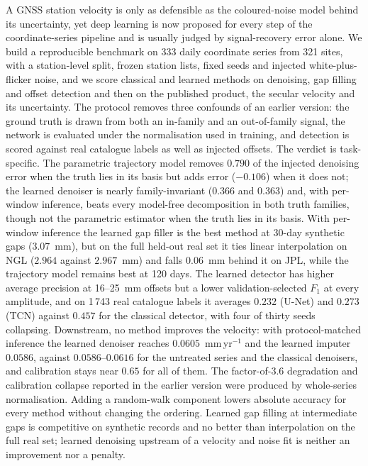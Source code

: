 A GNSS station velocity is only as defensible as the coloured-noise model behind
its uncertainty, yet deep learning is now proposed for every step of the
coordinate-series pipeline and is usually judged by signal-recovery error alone.
We build a reproducible benchmark on 333 daily coordinate series from 321 sites,
with a station-level split, frozen station lists, fixed seeds and injected
white-plus-flicker noise, and we score classical and learned methods on
denoising, gap filling and offset detection and then on the published product,
the secular velocity and its uncertainty. The protocol removes three confounds of
an earlier version: the ground truth is drawn from both an in-family and an
out-of-family signal, the network is evaluated under the normalisation used in
training, and detection is scored against real catalogue labels as well as
injected offsets. The verdict is task-specific. The parametric trajectory model
removes $0.790$ of the injected denoising error when the truth lies in its basis
but adds error ($-0.106$) when it does not; the learned denoiser is nearly
family-invariant ($0.366$ and $0.363$) and, with per-window inference, beats
every model-free decomposition in both truth families, though not the
parametric estimator when the truth lies in its basis. With per-window inference the learned gap filler is
the best method at 30-day synthetic gaps ($3.07$~mm), but on the full held-out
real set it ties linear interpolation on NGL ($2.964$ against $2.967$~mm) and
falls $0.06$~mm behind it on JPL, while the trajectory model remains best at
120 days. The learned
detector has higher average precision at 16--25~mm offsets but a lower
validation-selected $F_1$ at every amplitude, and on 1\,743 real catalogue labels
it averages $0.232$ (U-Net) and $0.273$ (TCN) against $0.457$ for the classical
detector, with four of thirty seeds collapsing. Downstream, no method improves the velocity: with protocol-matched
inference the learned denoiser reaches $0.0605$~mm\,yr$^{-1}$ and the learned
imputer $0.0586$, against $0.0586$--$0.0616$ for the untreated series and the
classical denoisers, and calibration stays near $0.65$ for all of them. The
factor-of-$3.6$ degradation and calibration collapse reported in the earlier
version were produced by whole-series normalisation. Adding a random-walk
component lowers absolute accuracy for every method without changing the
ordering. Learned gap filling at intermediate gaps is competitive on synthetic
records and no better than interpolation on the full real set; learned
denoising upstream of a velocity and noise fit is neither an improvement nor a
penalty.
